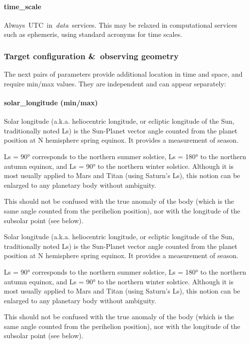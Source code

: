 \documentclass[11pt,a4paper]{ivoa}
\begin{document}
\paragraph{time\_scale}

Always UTC in \emph{data} services. This may be relaxed in computational services such as ephemeris, using standard acronyms for time scales.

\subsubsection{Target configuration \& observing geometry}

The next pairs of parameters provide additional location in time and space, and require min/max values. They are independent and can appear separately:

\paragraph{solar\_longitude (min/max)}

Solar longitude (a.k.a. heliocentric longitude, or ecliptic longitude of the Sun, traditionally noted Ls) is the Sun-Planet vector angle counted from the planet position at N hemisphere spring equinox. It provides a measurement of season.

Ls = 90° corresponds to the northern summer solstice, Ls = 180° to the northern autumn equinox, and Ls = 90° to the northern winter solstice. Although it is most usually applied to Mars and Titan (using Saturn's Ls), this notion can be enlarged to any planetary body without ambiguity.

This should not be confused with the true anomaly of the body (which is the same angle counted from the perihelion position), nor with the longitude of the subsolar point (see below).

Solar longitude (a.k.a. heliocentric longitude, or ecliptic longitude of the Sun, traditionally noted Ls) is the Sun-Planet vector angle counted from the planet position at N hemisphere spring equinox. It provides a measurement of season.

Ls = 90° corresponds to the northern summer solstice, Ls = 180° to the northern autumn equinox, and Ls = 90° to the northern winter solstice. Although it is most usually applied to Mars and Titan (using Saturn's Ls), this notion can be enlarged to any planetary body without ambiguity.

This should not be confused with the true anomaly of the body (which is the same angle counted from the perihelion position), nor with the longitude of the subsolar point (see below).
\end{document}
